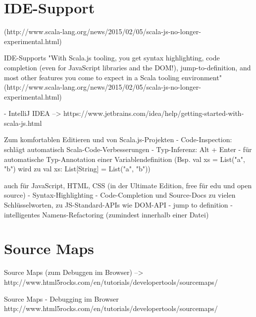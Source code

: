 \documentclass[a4paper, 12pt, hidelinks, listof=totoc, listoftables=totoc, bibliography=totoc]{scrreprt}
\begin{document}























\section{IDE-Support}
(http://www.scala-lang.org/news/2015/02/05/scala-js-no-longer-experimental.html)

IDE-Supports
  "With Scala.js tooling, you get syntax highlighting, code completion (even for JavaScript libraries and the DOM!), jump-to-definition, and most other features you come to expect in a Scala tooling environment" (http://www.scala-lang.org/news/2015/02/05/scala-js-no-longer-experimental.html)

  - IntelliJ IDEA  -->  https://www.jetbrains.com/idea/help/getting-started-with-scala-js.html

    Zum komfortablen Editieren und von Scala.js-Projekten
    - Code-Inspection: schlägt automatisch Scala-Code-Verbesserungen
    - Typ-Inferenz: Alt + Enter - für automatische Typ-Annotation einer Variablendefinition (Bsp. val xs = List("a", "b") wird zu val xs: List[String] = List("a", "b"))

    auch für JavaScript, HTML, CSS (in der Ultimate Edition, free für edu und open source)
      - Syntax-Highlighting
      - Code-Completion und Source-Docs zu vielen Schlüsselworten, zu JS-Standard-APIs wie DOM-API
      - jump to definition
      - intelligentes Namens-Refactoring (zumindest innerhalb einer Datei)


\section{Source Maps}

Source Maps (zum Debuggen im Browser)  -->  http://www.html5rocks.com/en/tutorials/developertools/sourcemaps/

Source Maps
  - Debugging im Browser
  http://www.html5rocks.com/en/tutorials/developertools/sourcemaps/
\end{document}
